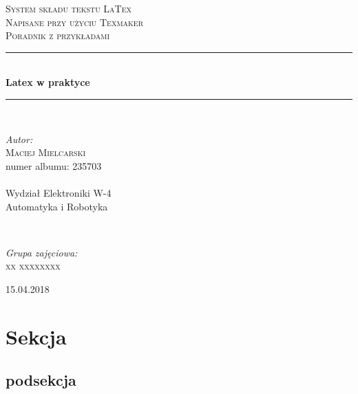 \documentclass{article}
\begin{document}
\begin{titlepage} 

	\newcommand{\HRule}{\rule{\linewidth}{0.5mm}} 
	
	\center 
	\textsc{\LARGE System składu tekstu LaTex}\\[1.5cm] 					%
	\textsc{\Large Napisane przy użyciu Texmaker}\\[0.5cm] 		%
	\textsc{\large Poradnik z przykładami}\\[0.5cm] 			%

	\HRule\\[0.4cm]
	{\huge\bfseries Latex w praktyce}\\[0.4cm] 		%
	\HRule\\[1.5cm]

	
	\begin{minipage}{0.5\textwidth}
		\begin{flushleft}
			\large
			\textit{Autor:}\\
			\textsc{Maciej Mielcarski} \\numer albumu: 235703\\~\\Wydział Elektroniki W-4\\Automatyka i Robotyka 
		\end{flushleft}
	\end{minipage}
	~
	\begin{minipage}{0.4\textwidth}
		\begin{flushright}
			\large
			\textit{Grupa zajęciowa:}\\
			\textsc{xx xxxxxxxx} 
		\end{flushright}
	\end{minipage}

\vfill\vfill\vfill 				%
	
	{\large 15.04.2018} 		%
	
\end{titlepage}

\tableofcontents				%
\newpage						%

\section{Sekcja}
\subsection{podsekcja}
\end{document}
